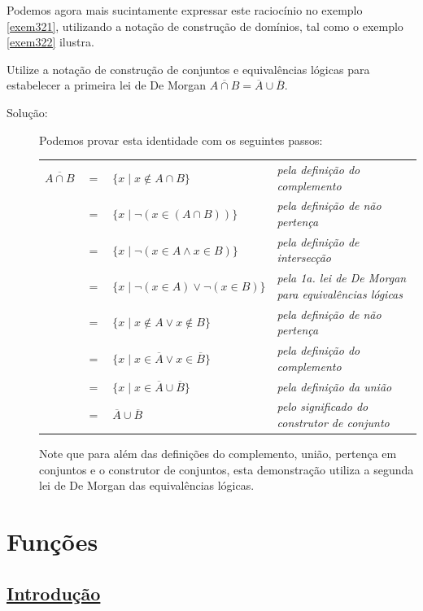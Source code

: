 Podemos agora mais sucintamente expressar este raciocínio no exemplo
\ref{exem321}, utilizando a notação de construção de domínios, tal como o
exemplo \ref{exem322} ilustra.

\begin{exmp}
\label{exem322}
Utilize a notação de construção de conjuntos e equivalências lógicas para
estabelecer a primeira lei de De Morgan $\overline{A \cap B} = \overline{A}
\cup \overline{B}$.
\begin{description}
\item[Solução:]Podemos provar esta identidade com os seguintes passos:

\begin{table}[H]
	\centering
	\begin{tabular}{rcll}%
	$\overline{A \cap B}$&$=$ & $\{x \mid x \notin A \cap B\}$ 			& \emph{pela
	definição do complemento}\\
	 					 &$=$ & $\{x \mid \lnot (x \in (A \cap B))\}$	& \emph{pela definição de
	 					 não pertença}\\
	 					 &$=$ & $\{x \mid \lnot (x \in A \land x \in B)\}$ & \emph{pela
	 					 definição de intersecção}\\
						 &$=$ & $\{x \mid \lnot(x \in A) \lor \lnot (x \in B)\}$ & \emph{pela
						 1a. lei de De Morgan para equivalências lógicas} \\
						 &$=$ & $\{x \mid x \notin A \lor x \notin B\}$ & \emph{pela definição de
						 não pertença}\\
						 &$=$ & $\{x \mid x \in \overline{A} \lor x \in \overline{B}\}$ &
						 \emph{pela definição do complemento}\\
						 &$=$ & $\{x \mid x \in \overline{A} \cup \overline{B}\}$ & \emph{pela
						 definição da união}\\
						 &$=$ & $\overline{A} \cup \overline{B}$ & \emph{pelo significado do
						 construtor de conjunto}			 
	\end{tabular}%
\end{table}
Note que para além das definições do complemento, união, pertença em conjuntos e
o construtor de conjuntos, esta demonstração utiliza a segunda lei de De Morgan
das equivalências lógicas.
\end{description}
\end{exmp}

\section{Funções}
\subsection*{\underline{Introdução}}

